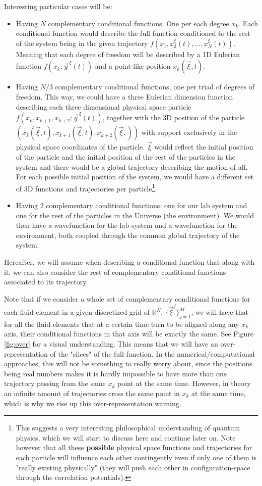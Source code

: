 \documentclass[11pt, a4paper]{article} %
\newcommand{\R}{\mathbb{R}} %
\begin{document}
Interesting particular cases will be:
\begin{itemize}
\item Having $N$ complementary conditional functions. One per each degree $x_k$. Each conditional function would describe the full function conditioned to the rest of the system being in the given trajectory $f(x_1,x_2^\xi(t),...,x_N^\xi(t))$. Meaning that each degree of freedom will be described by a 1D Eulerian function $f(x_k;\vec{y}^{\, \xi}(t))$ and a point-like position $x_k(\vec{\xi},t)$.
\item Having $N/3$ complementary conditional functions, one per triad of degrees of freedom. This way, we could have a three Eulerian dimension function describing each three dimensional physical space particle $f(x_k,x_{k+1},x_{k+2}; \vec{y}^{\, \xi}(t))$, together with the 3D position of the particle $(x_{k}(\vec{\xi},t), x_{k+1}(\vec{\xi},t),x_{k+2}(\vec{\xi},))$ with support exclusively in the physical space coordinates of the particle. $\vec{\xi}$ would reflect the initial position of the particle and the initial position of the rest of the particles in the system and there would be a global trajectory describing the motion of all. For each possible initial position of the system, we would have a different set of 3D functions and trajectories per particle\footnote{ This suggests a very interesting philosophical understanding of quantum physics, which we will start to discuss here and continue later on. Note however that all these {\bf possible} physical space functions and trajectories for each particle will influence each other contingently even if only one of them is "really existing physically" (they will push each other in configuration-space through the correlation potentials).}.
\item Having 2 complementary conditional functions: one for our lab system and one for the rest of the particles in the Universe (the environment). We would then have a wavefunction for the lab system and a wavefunction for the environment, both coupled through the common global trajectory of the system.
\end{itemize} 
Hereafter, we will assume when describing a conditional function that along with it, we can also consider the rest of complementary conditional functions associated to its trajectory.

Note that if we consider a whole set of complementary conditional functions for each fluid element in a given discretized grid of $\R^N$, $\{\vec{\xi}^j\}_{j=1}^M$, we will have that for all the fluid elements that at a certain time turn to be aligned along any $x_k$ axis, their conditional functions in that axis will be exactly the same. See Figure \ref{fig:over} for a visual understanding. This means that we will have an over-representation of the "slices" of the full function. In the numerical/computational approaches, this will not be something to really worry about, since the positions being real numbers makes it is hardly impossible to have more than one trajectory passing from the same $x_k$ point at the same time. However, in theory an infinite amount of trajectories cross the same point in $x_k$ at the same time, which is why we rise up this over-representation warning.\vspace{0.5cm}
\end{document}
